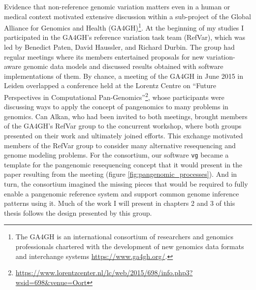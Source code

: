 Evidence that non-reference genomic variation matters even in a human or medical context motivated extensive discussion within a sub-project of the Global Alliance for Genomics and Health (GA4GH)\footnote{The GA4GH is an international consortium of researchers and genomics professionals chartered with the development of new genomics data formats and interchange systems \url{https://www.ga4gh.org/}.}.
At the beginning of my studies I participated in the GA4GH's reference variation task team (RefVar), which was led by Benedict Paten, David Haussler, and Richard Durbin.
The group had regular meetings where its members entertained proposals for new variation-aware genomic data models and discussed results obtained with software implementations of them.
By chance, a meeting of the GA4GH in June 2015 in Leiden overlapped a conference held at the Lorentz Centre on ``Future Perspectives in Computational Pan-Genomics''\footnote{\url{https://www.lorentzcenter.nl/lc/web/2015/698/info.php3?wsid=698\&venue=Oort}}, whose participants were discussing ways to apply the concept of pangenomics to many problems in genomics.
Can Alkan, who had been invited to both meetings, brought members of the GA4GH's RefVar group to the concurrent workshop, where both groups presented on their work and ultimately joined efforts.
This exchange motivated members of the RefVar group to consider many alternative resequencing and genome modeling problems.
For the consortium, our software {\tt vg} became a template for the pangenomic resequencing concept that it would present in the paper resulting from the meeting \cite{computational2016computational} (figure \ref{fig:pangenomic_processes}).
And in turn, the consortium imagined the missing pieces that would be required to fully enable a pangenomic reference system and support common genome inference patterns using it.
Much of the work I will present in chapters 2 and 3 of this thesis follows the design presented by this group.

